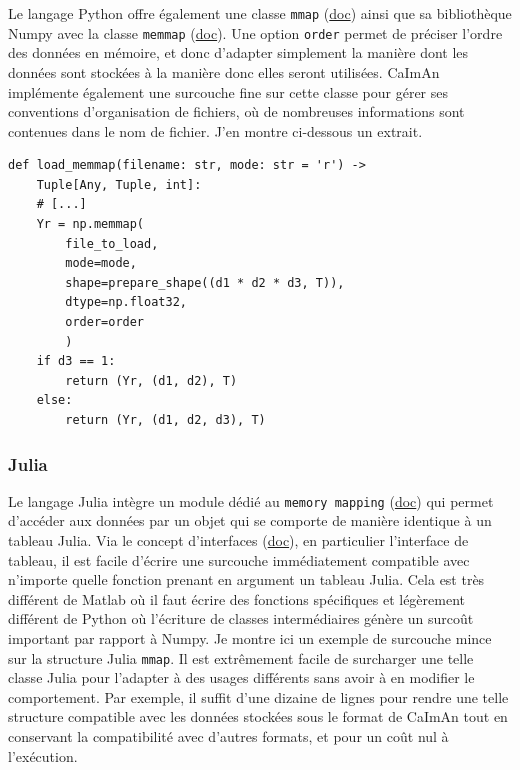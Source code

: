 Le langage Python offre également une classe \verb|mmap| (\href{https://docs.python.org/3.8/library/mmap.html}{doc}) ainsi que sa bibliothèque Numpy avec la classe \verb|memmap| (\href{https://numpy.org/devdocs/reference/generated/numpy.memmap.html}{doc}). Une option \verb|order| permet de préciser l'ordre des données en mémoire, et donc d'adapter simplement la manière dont les données sont stockées à la manière donc elles seront utilisées. CaImAn implémente également une surcouche fine sur cette classe pour gérer ses conventions d'organisation de fichiers, où de nombreuses informations sont contenues dans le nom de fichier. J'en montre ci-dessous un extrait.

\pythonstyle
\begin{lstlisting}
def load_memmap(filename: str, mode: str = 'r') ->
    Tuple[Any, Tuple, int]:
    # [...]
    Yr = np.memmap(
        file_to_load,
        mode=mode,
        shape=prepare_shape((d1 * d2 * d3, T)),
        dtype=np.float32,
        order=order
        )
    if d3 == 1:
        return (Yr, (d1, d2), T)
    else:
        return (Yr, (d1, d2, d3), T)
\end{lstlisting}


\subsubsection{Julia}

Le langage Julia intègre un module dédié au \verb|memory mapping| (\href{https://docs.julialang.org/en/v1/stdlib/Mmap/index.html#Mmap.mmap}{doc}) qui permet d'accéder aux données par un objet qui se comporte de manière identique à un tableau Julia. Via le concept d'interfaces (\href{https://docs.julialang.org/en/v1/manual/interfaces/#man-interface-array-1}{doc}), en particulier l'interface de tableau, il est facile d'écrire une surcouche immédiatement compatible avec n'importe quelle fonction prenant en argument un tableau Julia. Cela est très différent de Matlab où il faut écrire des fonctions spécifiques et légèrement différent de Python où l'écriture de classes intermédiaires génère un surcoût important par rapport à Numpy. Je montre ici un exemple de surcouche mince sur la structure Julia \verb|mmap|.
Il est extrêmement facile de surcharger une telle classe Julia pour l'adapter à des usages différents sans avoir à en modifier le comportement. Par exemple, il suffit d'une dizaine de lignes pour rendre une telle structure compatible avec les données stockées sous le format de CaImAn tout en conservant la compatibilité avec d'autres formats, et pour un coût nul à l'exécution.

